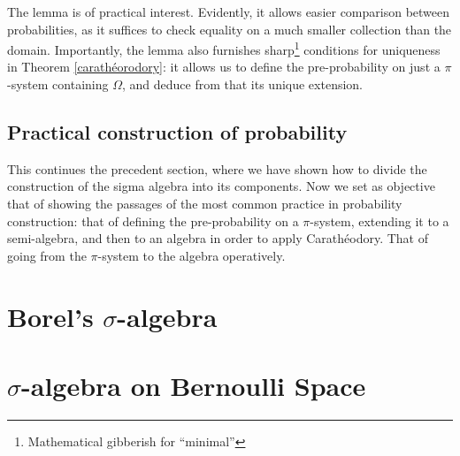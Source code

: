 \begin{my_remark}
	The lemma is of practical interest. Evidently, it allows easier comparison between probabilities, as it suffices to check equality on a much smaller collection than the domain. Importantly, the lemma also furnishes sharp\footnote{Mathematical gibberish for ``minimal''} conditions for uniqueness in Theorem \ref{carathéorodory}: it allows us to define the pre-probability on just a $\pi$-system containing $\Omega$, and deduce from that its unique extension.
\end{my_remark}

\subsection{Practical construction of probability}

This continues the precedent section, where we have shown how to divide the construction of the sigma algebra into its components. Now we  set as objective that of showing the passages of the most common practice in probability construction: that of defining the pre-probability on a $\pi$-system, extending it to a semi-algebra, and then to an algebra in order to apply Carathéodory. That of going from the $\pi$-system to the algebra operatively. 








\section*{Borel's $\sigma$-algebra}

\section*{$\sigma$-algebra on Bernoulli Space}

% 






